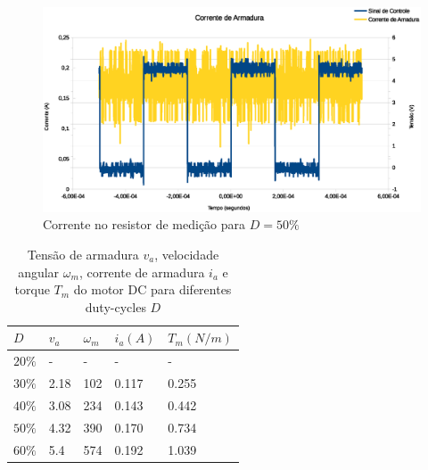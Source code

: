 \documentclass{article}
\begin{document}
\begin{figure}[H]
	\centering
	\includegraphics[width=\linewidth]{Dados/Buck/ia}
	\caption{Corrente no resistor de medição para $D=50\%$}
	\label{fig:iabuck}
\end{figure}

\begin{table}[H]
	\centering
	\caption{Tensão de armadura $v_a$, velocidade angular $\omega_m$, corrente de armadura $i_a$ e torque $T_m$ do motor DC para diferentes duty-cycles $D$}
	\label{tab:vabuck}
	\begin{tabular}{|l|l|l|l|l|}
		\hline
		$D$    & $v_a$ & $\omega_m$ & $i_a (A)$ & $T_m (N/m)$ \\ \hline
		$20\%$ & -     & -          & -         & -           \\ \hline
		$30\%$ & 2.18  & 102        & 0.117     & 0.255       \\ \hline
		$40\%$ & 3.08  & 234        & 0.143     & 0.442       \\ \hline
		$50\%$ & 4.32  & 390        & 0.170     & 0.734       \\ \hline
		$60\%$ & 5.4   & 574        & 0.192     & 1.039       \\ \hline
	\end{tabular}
\end{table}
\end{document}
